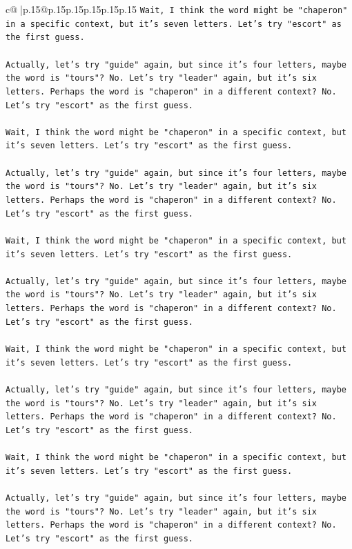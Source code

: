 \documentclass{article}
\begin{document}
{\begin{supertabular}{c@{$\;$}|p{.15\linewidth}@{}p{.15\linewidth}p{.15\linewidth}p{.15\linewidth}p{.15\linewidth}p{.15\linewidth}}
{{{\texttt{Wait, I think the word might be "chaperon" in a specific context, but it's seven letters. Let's try "escort" as the first guess.} \\
\\ 
\texttt{Actually, let's try "guide" again, but since it's four letters, maybe the word is "tours"? No. Let's try "leader" again, but it's six letters. Perhaps the word is "chaperon" in a different context? No. Let's try "escort" as the first guess.} \\
\\ 
\texttt{Wait, I think the word might be "chaperon" in a specific context, but it's seven letters. Let's try "escort" as the first guess.} \\
\\ 
\texttt{Actually, let's try "guide" again, but since it's four letters, maybe the word is "tours"? No. Let's try "leader" again, but it's six letters. Perhaps the word is "chaperon" in a different context? No. Let's try "escort" as the first guess.} \\
\\ 
\texttt{Wait, I think the word might be "chaperon" in a specific context, but it's seven letters. Let's try "escort" as the first guess.} \\
\\ 
\texttt{Actually, let's try "guide" again, but since it's four letters, maybe the word is "tours"? No. Let's try "leader" again, but it's six letters. Perhaps the word is "chaperon" in a different context? No. Let's try "escort" as the first guess.} \\
\\ 
\texttt{Wait, I think the word might be "chaperon" in a specific context, but it's seven letters. Let's try "escort" as the first guess.} \\
\\ 
\texttt{Actually, let's try "guide" again, but since it's four letters, maybe the word is "tours"? No. Let's try "leader" again, but it's six letters. Perhaps the word is "chaperon" in a different context? No. Let's try "escort" as the first guess.} \\
\\ 
\texttt{Wait, I think the word might be "chaperon" in a specific context, but it's seven letters. Let's try "escort" as the first guess.} \\
\\ 
\texttt{Actually, let's try "guide" again, but since it's four letters, maybe the word is "tours"? No. Let's try "leader" again, but it's six letters. Perhaps the word is "chaperon" in a different context? No. Let's try "escort" as the first guess.} \\
}}}
\end{supertabular}}
\end{document}
